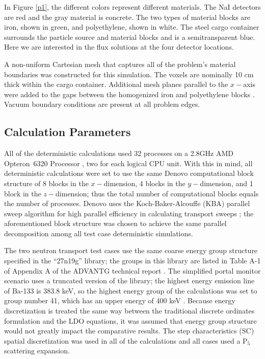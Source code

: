 \documentclass{article} %
\begin{document}
In Figure \ref{p1}, the different colors represent different materials. The NaI
detectors are red and the gray material is concrete. The two types of material
blocks are iron, shown in green, and polyethylene, shown in white. The steel
cargo container surrounds the particle source and material blocks and is a
semitransparent blue. Here we are interested in the flux solutions at the four
detector locations.

A non-uniform Cartesian mesh that captures all of the problem's material
boundaries was constructed for this simulation. The voxels are nominally 10 cm
thick within the cargo container. Additional mesh planes parallel to the
$x-$axis were added to the gaps between the homogenized iron and polyethylene
blocks \cite{advantg}. Vacuum boundary conditions are present at all problem
edges.

\subsection{Calculation Parameters}

All of the deterministic calculations used 32 processes on a 2.8GHz AMD 
Opteron\texttrademark\ 6320 Processor \cite{amd}, two for each logical CPU
unit. With this in mind, all deterministic calculations were set to use the
same Denovo computational block structure of 8 blocks 
in the $x-$dimension, 4 blocks in the $y-$dimension, and 1 block in the 
$z-$dimension; thus the total number of computational blocks equals the number
of processes. Denovo uses the Koch-Baker-Alcouffe (KBA) parallel sweep
algorithm for high parallel efficiency in calculating transport sweeps
\cite{denovo}; the aforementioned block structure was chosen to achieve the
same parallel decomposition among all test case deterministic simulations. 

The two neutron transport test cases use the same coarse energy group structure
specified in  the ``27n19g'' library; the groups in this library are listed in 
Table A-1 of Appendix A of the ADVANTG technical report \cite{advantg}.
The simplified portal monitor scenario uses a truncated version of the library;
the highest energy emission line of Ba-133 is 383.8 keV, so the highest energy
group of the calculations was set to group number 41, which has an upper energy
of 400 keV \cite{advantg}. Because 
energy discretization is treated the same way between the traditional discrete
ordinates formulation and the LDO equations, it was assumed that energy group 
structure would not greatly impact the comparative results.
The step characteristics (SC) spatial discretization was used in all of the
calculations and all cases used a P$_5$ scattering expansion.
\end{document}
